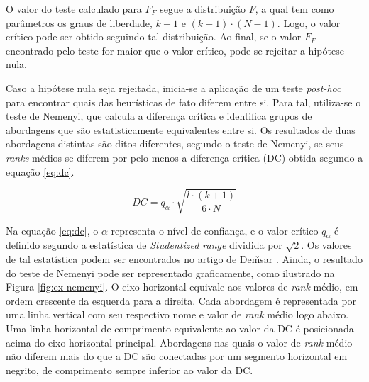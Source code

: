 O valor do teste calculado para $F_F$  segue a distribuição $F$, a qual tem como
parâmetros os graus  de liberdade, $k -  1$ e $(k -  1) \cdot (N -  1)$. Logo, o
valor crítico  pode ser obtido seguindo  tal distribuição. Ao final,  se o valor
$F_F$ encontrado  pelo teste for maior  que o valor crítico,  pode-se rejeitar a
hipótese nula.

Caso  a  hipótese  nula  seja  rejeitada, inicia-se  a  aplicação  de  um  teste
\textit{post-hoc} para encontrar quais das heurísticas de fato diferem entre si.
Para  tal, utiliza-se  o teste  de Nemenyi,  que calcula  a diferença  crítica e
identifica grupos de abordagens que  são estatisticamente equivalentes entre si.
Os resultados de duas abordagens distintas são ditos diferentes, segundo o teste
de Nemenyi, se seus \textit{ranks} médios  se diferem por pelo menos a diferença
crítica (DC) obtida segundo a equação \eqref{eq:dc}.

\begin{equation}
    DC = q_{\alpha} \cdot \sqrt{\frac{l \cdot (k + 1)}{6 \cdot N}} \label{eq:dc}
\end{equation}

Na equação \eqref{eq:dc}, o $\alpha$ representa  o nível de confiança, e o valor
crítico  $q_{\alpha}$ é  definido segundo  a estatística  de \textit{Studentized
range}  dividida  por  $\sqrt{2}$.  Os  valores de  tal  estatística  podem  ser
encontrados no  artigo de De\v{m}sar  \cite{demsar:2006}. Ainda, o  resultado do
teste de  Nemenyi pode ser  representado graficamente, como ilustrado  na Figura
\ref{fig:ex-nemenyi}. O  eixo horizontal  equivale aos valores  de \textit{rank}
médio,  em  ordem  crescente  da  esquerda para  a  direita.  Cada  abordagem  é
representada  por  uma  linha  vertical  com seu  respectivo  nome  e  valor  de
\textit{rank} médio logo abaixo. Uma linha horizontal de comprimento equivalente
ao valor da DC é posicionada  acima do eixo horizontal principal. Abordagens nas
quais o valor de \textit{rank} médio não diferem mais do que a DC são conectadas
por um segmento  horizontal em negrito, de comprimento sempre  inferior ao valor
da DC.

